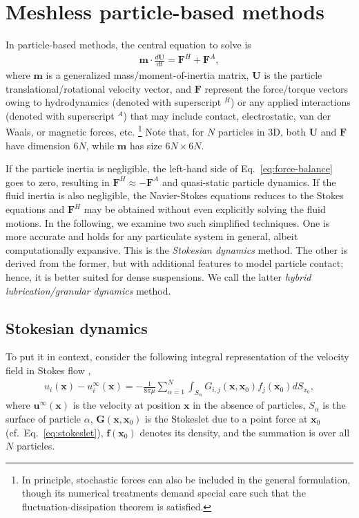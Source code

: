 \section{Meshless particle-based methods}
\label{sec:num-dem}

In particle-based methods, the central equation to solve is
\begin{equation} 
 \begin{aligned} \label{eq:force-balance}
  {\bm m} \cdot \frac{d{\bm U}}{dt} = {\bm F}^H + {\bm F}^A, 
 \end{aligned}
\end{equation}
where ${\bm m}$ is a generalized mass/moment-of-inertia matrix,
${\bm U}$ is the particle translational/rotational velocity vector,
and ${\bm F}$ represent the force/torque vectors owing to hydrodynamics (denoted with superscript $^H$) or any applied interactions (denoted with superscript $^A$) that may include contact, electrostatic, van der Waals, or magnetic forces, etc.%
\footnote{In principle, stochastic forces can also be included in the general formulation, though its numerical treatments demand special care such that the fluctuation-dissipation theorem is satisfied.}
Note that, for $N$ particles in 3D, both ${\bm U}$ and ${\bm F}$ have dimension $6N$, while ${\bm m}$ has size $6N \times 6N$.

If the particle inertia is negligible, the left-hand side of Eq.\ \eqref{eq:force-balance} goes to zero, resulting in $\bm{F}^H \approx -\bm{F}^A$ and quasi-static particle dynamics.
If the fluid inertia is also negligible, the Navier-Stokes equations reduces to the Stokes equations and $\bm{F}^H$ may be obtained without even explicitly solving the fluid motions.
In the following, we examine two such simplified techniques.
One is more accurate and holds for any particulate system in general, albeit computationally expansive. This is the \emph{Stokesian dynamics} method.
The other is derived from the former, but with additional features to model particle contact; hence, it is better suited for dense suspensions. We call the latter \emph{hybrid lubrication/granular dynamics} method.

\subsection{Stokesian dynamics}
\label{subsec:sd}

To put it in context, consider the following integral representation of the velocity field in Stokes flow \citep{Ladyzhenskaya},
\begin{equation} \label{eq:boundary-integral}
 \begin{aligned}
  u_i(\bm{x}) - u_i^\infty(\bm{x}) = -\frac{1}{8\pi \mu} \sum_{\alpha=1}^N  \int_{S_\alpha} G_{i,j} (\bm{x},\bm{x}_0) f_j(\bm{x}_0) dS_{x_0},
 \end{aligned}
\end{equation}
where $\bm{u}^\infty(\bm{x})$ is the velocity at position $\bm{x}$ in the absence of particles,
$S_\alpha$ is the surface of particle $\alpha$,
$\bm{G}(\bm{x},\bm{x}_0)$ is the Stokeslet due to a point force at $\bm{x}_0$ (cf.\ Eq.\ \ref{eq:stokeslet}),
$\bm f(\bm{x}_0)$ denotes its density,
and the summation is over all $N$ particles.

